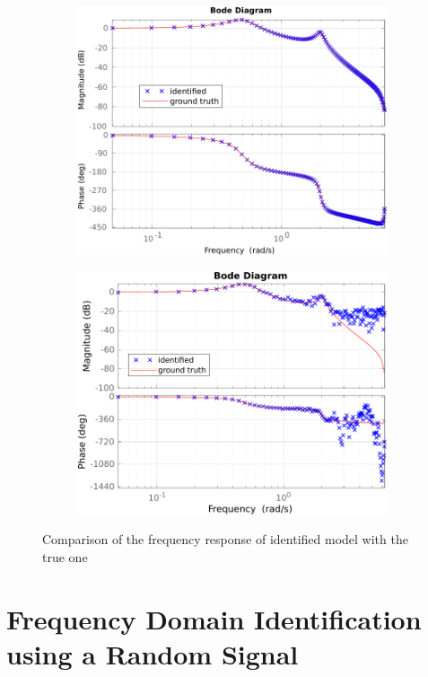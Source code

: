 \documentclass{scrartcl}
\newcommand*{\matlabcode}[3]{\begin{figure}[h!]\end{figure}}
\begin{document}
\begin{figure}[h]
	\begin{subfigure}{0.45\textwidth}
		\includegraphics[width=\textwidth]{figures/resp_nonoise.pdf}
		\label{fig:resp_noiseless}
	\end{subfigure}
	\hspace*{0.05\textwidth}
	\begin{subfigure}{0.45\textwidth}
		\includegraphics[width=\textwidth]{figures/resp_noise.pdf}
		\label{fig:resp_noise}
	\end{subfigure}
	\caption{Comparison of the frequency response of identified model with the true one}\label{fig:f_resp}
\end{figure}
\matlabcode{../matlab/ce1/estimate_frequency_response.m}
{{Compute frequency response of the system to be identified using an average of Fourier transforms of each period. The first period is skipped as we wait for transience to vanish. Additionally, the frequency vector is computed.}}
{lst:freq_resp}

\section{Frequency Domain Identification using a Random Signal}
\end{document}
